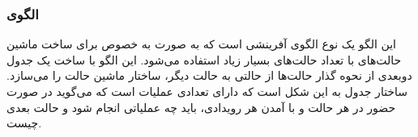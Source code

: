 \subsubsection{الگوی }
\label{smStateTableSec}
\begin{RTL}
این الگو یک نوع الگوی آفرینشی است که به صورت به خصوص برای ساخت ماشین حالت‌های
با تعداد حالت‌های بسیار زیاد استفاده می‌شود. این الگو با ساخت یک جدول دوبعدی
از نحوه گذار حالت‌ها از حالتی به حالت دیگر، ساختار ماشین حالت را می‌سازد.
ساختار جدول به این شکل است که دارای تعدادی عملیات است که می‌گوید در صورت
حضور در هر حالت و با آمدن هر رویدادی، باید چه عملیاتی انجام شود و حالت بعدی
چیست.
\end{RTL}